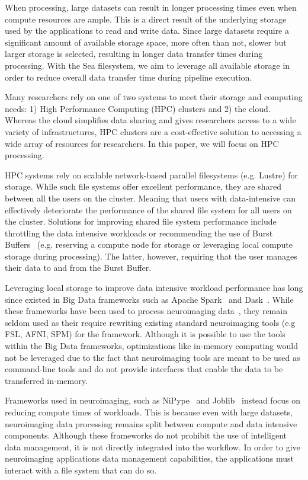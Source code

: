     When processing, large datasets can result in longer processing times even when compute resources are ample.
    This is a direct result of the underlying storage used by the applications to read and write data. Since large
    datasets require a significant amount of available storage space, more often than not, slower but larger storage is
    selected, resulting in longer data transfer times during processing. With the Sea filesystem, we aim to
    leverage all available storage in order to reduce overall data transfer time during pipeline execution.
    
    Many researchers rely on one of two systems to meet their storage and computing needs: 1) High Performance 
    Computing (HPC) clusters and 2) the cloud. Whereas the cloud simplifies data sharing and gives researchers
    access to a wide variety of infrastructures, HPC clusters are a cost-effective solution to accessing a wide
    array of resources for researchers. In this paper, we will focus on HPC processing.
    
    HPC systems rely on scalable network-based parallel filesystems (e.g. Lustre) for storage. While such file
    systems offer excellent performance, they are shared between all the users on the cluster. Meaning that users
    with data-intensive can effectively deteriorate the performance of the shared file system for all users on
    the cluster. Solutions for improving shared file system performance include throttling the data intensive workloads
    or recommending the use of Burst Buffers~\cite{bb} (e.g. reserving a compute node for storage or leveraging
    local compute storage during processing). The latter, however, requiring that the user manages their data to
    and from the Burst Buffer.
    
    Leveraging local storage to improve data intensive workload performance has long since existed in Big Data
    frameworks such as Apache Spark~\cite{spark} and Dask~\cite{dask}. While these frameworks have been used to
    process neuroimaging data~\cite{manypapers}, they remain seldom used as their require rewriting existing
    standard neuroimaging tools (e.g FSL, AFNI, SPM) for the framework. Although it is possible to use the
    tools within the Big Data frameworks, optimizations like in-memory computing would not be leveraged due to 
    the fact that neuroimaging tools are meant to be used as command-line tools and do not provide interfaces that 
    enable the data to be transferred in-memory.
    
    Frameworks used in neuroimaging, such as NiPype~\cite{nipype} and Joblib~\cite{joblib} instead focus on reducing compute times of workloads.
    This is because even with large datasets, neuroimaging data processing remains split between compute and data
    intensive components. Although these frameworks do not prohibit the use of intelligent data management, it is not directly integrated
    into the workflow. In order to give neuroimaging applications data management capabilities, the applications must interact with a
    file system that can do so.
    
